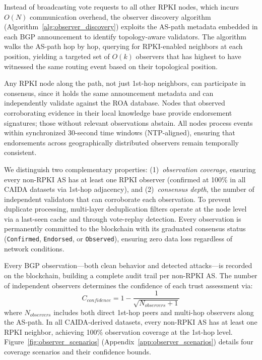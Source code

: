 Instead of broadcasting vote requests to all other RPKI nodes, which incurs $O(N)$ communication overhead, the observer discovery algorithm (Algorithm~\ref{alg:observer_discovery}) exploits the AS-path metadata embedded in each BGP announcement to identify topology-aware validators. The algorithm walks the AS-path hop by hop, querying for RPKI-enabled neighbors at each position, yielding a targeted set of $O(k)$ observers that has highest to have witnessed the same routing event based on their topological position. 

Any RPKI node along the path, not just 1st-hop neighbors, can participate in consensus, since it holds the same announcement metadata and can independently validate against the ROA database. Nodes that observed corroborating evidence in their local knowledge base provide endorsement signatures; those without relevant observations abstain. All nodes process events within synchronized 30-second time windows (NTP-aligned), ensuring that endorsements across geographically distributed observers remain temporally consistent.

We distinguish two complementary properties: (1)~\emph{observation coverage}, ensuring every non-RPKI AS has at least one RPKI observer (confirmed at 100\% in all CAIDA datasets via 1st-hop adjacency), and (2)~\emph{consensus depth}, the number of independent validators that can corroborate each observation. To prevent duplicate processing, multi-layer deduplication filters operate at the node level via a last-seen cache and through vote-replay detection. Every observation is permanently committed to the blockchain with its graduated consensus status (\texttt{Confirmed}, \texttt{Endorsed}, or \texttt{Observed}), ensuring zero data loss regardless of network conditions.

Every BGP observation---both clean behavior and detected attacks---is recorded on the blockchain, building a complete audit trail per non-RPKI AS. The number of independent observers determines the confidence of each trust assessment via:
\begin{equation}
C_{confidence} = 1 - \frac{1}{\sqrt{N_{observers} + 1}}
\end{equation}
where $N_{observers}$ includes both direct 1st-hop peers and multi-hop observers along the AS-path. In all CAIDA-derived datasets, every non-RPKI AS has at least one RPKI neighbor, achieving 100\% observation coverage at the 1st-hop level. Figure~\ref{fig:observer_scenarios} (Appendix~\ref{app:observer_scenarios}) details four coverage scenarios and their confidence bounds.

